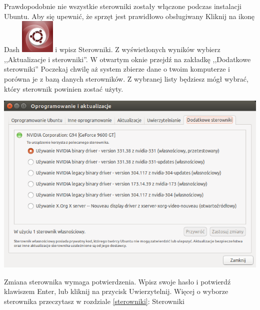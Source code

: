 Prawdopodobnie nie wszystkie sterowniki zostały włączone podczas instalacji Ubuntu. Aby się upewnić, że sprzęt jest prawidłowo obsługiwany Kliknij na ikonę Dash \includegraphics[scale=0.35]{images/ikony_dash.png} i wpisz \textcolor{ubuntu_orange}{Sterowniki}. Z wyświetlonych wyników wybierz ,,Aktualizacje i sterowniki''. W otwartym oknie przejdź na zakładkę ,,Dodatkowe sterowniki'' Poczekaj chwilę aż system zbierze dane o twoim komputerze i porówna je z bazą danych sterowników. Z wybranej listy będziesz mógł wybrać, który sterownik powinien zostać użyty.
\begin{center}
	\vspace{-10pt}
	\includegraphics[width=\linewidth]{images/pierwsze_uruchomienie_driver2.png}
\end{center}

Zmiana sterownika wymaga potwierdzenia. Wpisz swoje hasło i potwierdź klawiszem Enter, lub kliknij na przycisk \textcolor{ubuntu_orange}{Uwierzytelnij}. Więcej o wyborze sterownika przeczytasz w rozdziale \ref{sterowniki}: Sterowniki

